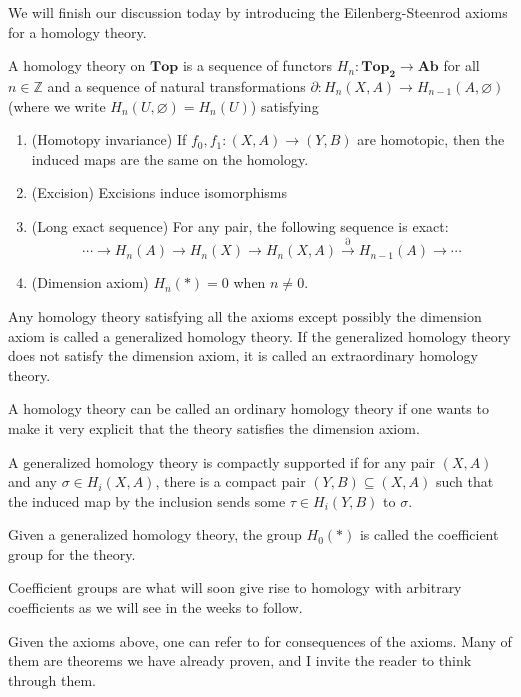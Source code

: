 \documentclass[12pt,reqno]{amsart}
\numberwithin{theorem}{section}
\theoremstyle{definition}
\theoremstyle{remark}
\numberwithin{equation}{section}
\newcommand{\Z}{\mathbb Z}
\newcommand{\del}{\partial}
\theoremstyle{definition}
\begin{document}
We will finish our discussion today by introducing the Eilenberg-Steenrod axioms for a homology theory.
\begin{definition}
    A homology theory on $\mathbf{Top}$ is a sequence of functors $H_n:\mathbf{Top_2}\rightarrow \mathbf{Ab}$ for all $n \in \Z$ and a sequence of natural transformations $\del : H_n(X,A)\rightarrow H_{n-1}(A,\varnothing)$ (where we write  $H_{n}(U,\varnothing) = H_n(U)$) satisfying
    \begin{enumerate}
        \item (Homotopy invariance) If $f_0,f_1:(X,A)\rightarrow (Y,B)$ are homotopic, then the induced maps are the same on the homology.
        \item (Excision) Excisions induce isomorphisms
        \item (Long exact sequence) For any pair, the following sequence is exact:
        $$\cdots \rightarrow H_n(A)\rightarrow H_n(X)\rightarrow H_n(X,A)\xrightarrow{\del} H_{n-1}(A)\rightarrow  \cdots $$
        \item (Dimension axiom) $H_n(*) = 0$ when $n\neq 0$. 
    \end{enumerate}
\end{definition}
\begin{definition}
    Any homology theory satisfying all the axioms except possibly the dimension axiom is called a generalized homology theory. If the generalized homology theory does not satisfy the dimension axiom, it is called an extraordinary homology theory. 
\end{definition}
A homology theory can be called an ordinary homology theory if one wants to make it very explicit that the theory satisfies the dimension axiom.
\begin{definition}
    A generalized homology theory is compactly supported if for any pair $(X,A)$ and any $\sigma \in H_i(X,A)$, there is a compact pair $(Y,B)\subseteq (X,A)$ such that the induced map by the inclusion sends some $\tau \in H_i(Y,B)$ to $\sigma$.
\end{definition}
\begin{definition}
    Given a generalized homology theory, the group $H_0(*)$ is called the coefficient group for the theory.
\end{definition}
Coefficient groups are what will soon give rise to homology with arbitrary coefficients as we will see in the weeks to follow.

Given the axioms above, one can refer to \cite{weintraub} for consequences of the axioms. Many of them are theorems we have already proven, and I invite the reader to think through them.
\end{document}
